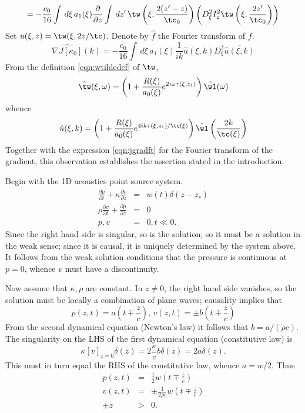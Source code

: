 \begin{equation}
\label{eqn:jgrad}
=-\frac{c_0}{16} \int \,d\xi\,a_1(\xi)\frac{\partial}{\partial z} \int \,dz'\, 
  \tw\left(\xi,\frac{2(z'-z)}{\tc_0}\right)\left(D_{\xi}^2I_z^2
    \tw\left(\xi,\frac{2z'}{\tc_0}\right)\right)
\end{equation} 
Set $u(\xi,z) = \tw(\xi,2z/\tc)$. Denote by $\hat{f}$ the Fourier
transform of $f$.  
\begin{equation}
\label{eqn:jgradft}
\widehat{\nabla J[\kappa_0]}(k) = -\frac{c_0}{16}\int\, d\xi\,a_1(\xi) 
\frac{1}{ik}\hat{u}(\xi,k)D_{\xi}^2\overline{\hat{u}(\xi,k)}
\end{equation}
From the definition \ref{eqn:wtildedef} of $\tw$,
\[
\hat{\tw}(\xi,\omega) = \left(1 + \frac{R(\xi)}{a_0(\xi)}e^{2i\omega\tau(\xi,z_1)}\right)\hat{\wl}(\omega)
\]
whence
\[
\hat{u}(\xi,k) = \left(1 +
  \frac{R(\xi)}{a_0(\xi)}e^{4ik\tau(\xi,z_1)/\tc(\xi)}\right)\hat{\wl}\left(\frac{2k}{\tc(\xi)}\right) 
\]
Together with the expression \ref{eqn:jgradft} for the Fourier
transform of the gradient, this observation establishes the assertion
stated in the introduction.

Begin with the 1D acoustics point source system. 
\begin{eqnarray}
\label{eqn:awe1d}
\frac{\partial p}{\partial t} +\kappa\frac{\partial 
  v}{\partial z} &=& w(t)\delta(z-z_s) \nonumber\\
\rho \frac{\partial v}{\partial t} + \frac{\partial p}{\partial 
  z}&=&0\nonumber\\
 p,v&=&0, t \ll 0. 
\end{eqnarray}
Since the right hand side is singular, so is the solution, so it must
be a solution in the weak sense; since it is causal, it is uniquely
determined by the system above. It follows from the weak solution
conditions that the pressure is continuous at $p=0$, whence $v$ must
have a discontinuity. 

Now assume that $\kappa, \rho$ are constant. 
In $z \ne 0$, the right hand side 
vanishes, so the solution must be locally a combination of plane
waves; causality implies that
\[
p(z,t)=a\left(t \mp \frac{z}{c}\right), \, v(z,t)=\pm b\left(t \mp
  \frac{z}{c}\right)
\]
From the second dynamical equation (Newton's law) it follows that $b =
a/(\rho c)$. The singularity on the LHS of the first dynamical
equation (constitutive law) is
\[
\kappa [v]_{z=0}\delta(z) =
2\frac{\kappa}{c}b\delta(z) = 2a\delta(z).
\] 
This must in turn equal the RHS of the constitutive law, whence
$a=w/2$. Thus
\begin{eqnarray}
\label{eqn:sol1d}
p(z,t) &=& \frac{1}{2}w\left(t \mp \frac{z}{c}\right) \nonumber \\
v(z,t) &=& \pm\frac{1}{2\rho c}w\left(t \mp \frac{z}{c}\right)
           \nonumber \\
\pm z &>& 0.
\end{eqnarray}

